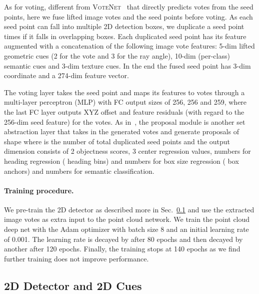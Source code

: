 \documentclass[10pt,twocolumn,letterpaper]{article}
\newcommand{\votenet}{\textsc{VoteNet}\xspace}
\begin{document}
As for voting, different from \votenet~ that directly predicts votes from the seed points, here we fuse lifted image votes and the seed points before voting. As each seed point can fall into multiple 2D detection boxes, we duplicate a seed point  times if it falls in  overlapping boxes. Each duplicated seed point has its feature augmented with a concatenation of the following image vote features: 5-dim lifted geometric cues (2 for the vote and 3 for the ray angle), 10-dim (per-class) semantic cues and 3-dim texture cues. In the end the fused seed point has 3-dim  coordinate and a 274-dim feature vector.

The voting layer takes the seed point and maps its features to votes through a multi-layer perceptron (MLP) with FC output sizes of 256, 256 and 259, where the
last FC layer outputs XYZ offset and feature residuals (with regard to the 256-dim seed feature) for the votes.
As in~\cite{voteNet}, the proposal module is another set abstraction layer that takes in the generated votes and generate proposals of shape  where  is the number of total duplicated seed points and the output dimension consists of 2 objectness scores, 3 center regression values,  numbers for heading regression ( heading bins) and  numbers for box size regression ( box anchors) and  numbers for semantic classification.

\paragraph{Training procedure.} We pre-train the 2D detector as described more in Sec.~\ref{supp:sec:2d} and use the extracted image votes as extra input to the point cloud network. We train the point cloud deep net with the Adam optimizer with batch size 8 and an initial learning rate of 0.001. The learning rate is decayed by  after 80 epochs and then decayed by another  after 120 epochs. Finally, the training stops at 140 epochs as we find further training does not improve performance.

\subsection{2D Detector and 2D Cues}
\label{supp:sec:2d}
\end{document}
